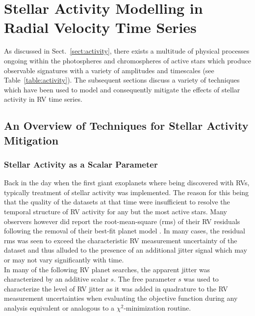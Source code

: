 \chapter{Stellar Activity Modelling in Radial Velocity Time Series}
As discussed in Sect.~\ref{sect:activity}, there exists a multitude of physical
processes ongoing within the photospheres and chromospheres of active stars
which produce observable signatures with a variety of amplitudes and timescales
(see Table~\ref{table:activity}). The subsequent sections discuss a variety of
techniques which have been used to model and consequently mitigate the effects of
stellar activity in RV time series.

\section{An Overview of Techniques for Stellar Activity Mitigation}
\label{sect:methods}

\subsection{Stellar Activity as a Scalar Parameter}
Back in the day when the first giant exoplanets where being discovered with RVs,
typically treatment of stellar activity was implemented. The reason for this being
that the quality of the datasets at that time were insufficient to resolve the
temporal structure of RV activity for any but the most active stars. Many
observers however did report the root-mean-square (rms) of their RV residuals
following the removal of their best-fit planet model
\citep[e.g.][]{mayor95,butler96}. In
many cases, the residual rms was seen to exceed the characteristic RV measurement
uncertainty of the dataset and thus alluded to the presence of an additional
jitter signal which may or may not vary significantly with time. \\

In many of the following RV planet searches, the apparent jitter was
characterized by
an additive scalar $s$. The free parameter $s$ was used to characterize the level
of RV jitter as it was added in quadrature to the RV measurement uncertainties
when evaluating the objective function during any analysis equivalent or
analogous to a $\chi^2$-minimization routine. 


